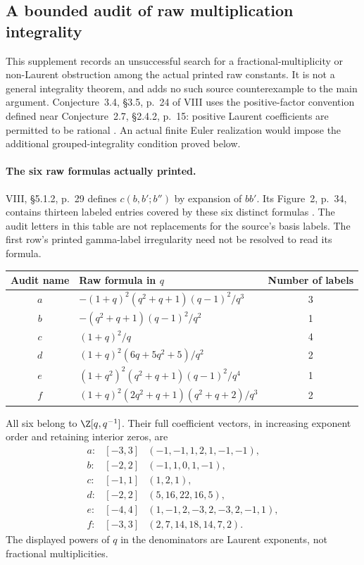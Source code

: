 \subsection{A bounded audit of raw multiplication integrality}

This  supplement records an unsuccessful
search for a fractional-multiplicity or non-Laurent
obstruction among the actual printed raw constants.
It is not a general integrality theorem, and adds
no such source counterexample to the main argument.
Conjecture~3.4, \S3.5, p.~24 of VIII uses the
positive-factor convention defined near
Conjecture~2.7, \S2.4.2, p.~15: positive Laurent
coefficients are permitted to be rational
\cite{VIII}. An actual finite Euler realization
would impose the additional grouped-integrality
condition proved below.

\paragraph{The six raw formulas actually printed.}
VIII, \S5.1.2, p.~29 defines
\(c(b,b';b'')\) by expansion of \(bb'\).
Its Figure~2, p.~34, contains thirteen labeled
entries covered by these six distinct formulas
\cite{VIII}. The audit letters in this table
are not replacements for the source's basis labels.
The first row's printed gamma-label irregularity
need not be resolved to read its formula.
\begin{center}
\begin{tabular}{c l c}
\toprule
Audit name & Raw formula in \(q\) & Number of labels\\
\midrule
\(a\)&\(- (1+q)^2(q^2+q+1)(q-1)^2/q^3\)&3\\[3pt]
\(b\)&\(- (q^2+q+1)(q-1)^2/q^2\)&1\\[3pt]
\(c\)&\((1+q)^2/q\)&4\\[3pt]
\(d\)&\((1+q)^2(6q+5q^2+5)/q^2\)&2\\[3pt]
\(e\)&\((1+q^2)^2(q^2+q+1)(q-1)^2/q^4\)&1\\[3pt]
\(f\)&\((1+q)^2(2q^2+q+1)(q^2+q+2)/q^3\)&2\\
\bottomrule
\end{tabular}
\end{center}
All six belong to \(\Z[q,q^{-1}]\).
Their full coefficient vectors, in increasing
exponent order and retaining interior zeros, are
\[
\begin{array}{ccl}
a:&[-3,3]&(-1,-1,1,2,1,-1,-1),\\
b:&[-2,2]&(-1,1,0,1,-1),\\
c:&[-1,1]&(1,2,1),\\
d:&[-2,2]&(5,16,22,16,5),\\
e:&[-4,4]&(1,-1,2,-3,2,-3,2,-1,1),\\
f:&[-3,3]&(2,7,14,18,14,7,2).
\end{array}
\]
The displayed powers of \(q\) in the denominators
are Laurent exponents, not fractional multiplicities.

